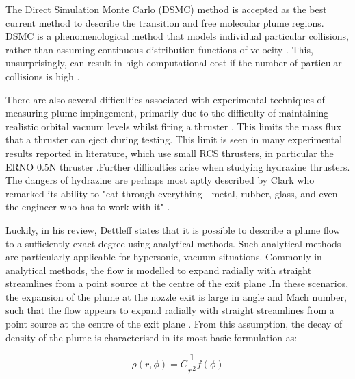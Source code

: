 \documentclass[journal]{new-aiaa}
\begin{document}
The Direct Simulation Monte Carlo (DSMC) method is accepted as the best current method to describe the transition and free molecular plume regions. DSMC is a phenomenological method that models individual particular collisions, rather than assuming continuous distribution functions of velocity \cite{birdMolecularGasDynamics2003}. This, unsurprisingly, can result in high computational cost if the number of particular collisions is high \cite{landauGuideMonteCarlo2021}. 

There are also several difficulties associated with experimental techniques of measuring plume impingement, primarily due to the difficulty of maintaining realistic orbital vacuum levels whilst firing a thruster \cite{dettleffBasicsPlumeImpingement2011}. This limits the mass flux that a thruster can eject during testing. This limit is seen in many experimental results reported in literature, which use small RCS thrusters, in particular the ERNO 0.5N thruster \cite{boydModelingSmallHydrazine1990,boydAssessmentImpingementEffects1989,leggePitotPressureHeattransfer1986,leggeModellingControlThruster1982}.Further difficulties arise when studying hydrazine thrusters. The dangers of hydrazine are perhaps most aptly described by Clark who remarked its ability to "eat through everything - metal, rubber, glass, and even the engineer who has to work with it" \cite{clarkIgnitionInformalHistory2017}.

Luckily, in his review, Dettleff states that it is possible to describe a plume flow to a sufficiently exact degree using analytical methods. Such analytical methods are particularly applicable for hypersonic, vacuum situations. Commonly in analytical methods, the flow is modelled to expand radially with straight streamlines from a point source at the centre of the exit plane \cite{mehtaUnderexpandedSupersonicPlume2011}.In these scenarios, the expansion of the plume at the nozzle exit is large in angle and Mach number, such that the flow appears to expand radially with straight streamlines from a point source at the centre of the exit plane \cite{mehtaUnderexpandedSupersonicPlume2011}. From this assumption, the decay of density of the plume is characterised in its most basic formulation as:

\begin{equation}
    \rho(r, \phi ) = C \frac{1}{r^2} f(\phi)
    \label{eq_back_densityDecayBasic}
\end{equation}
\end{document}
